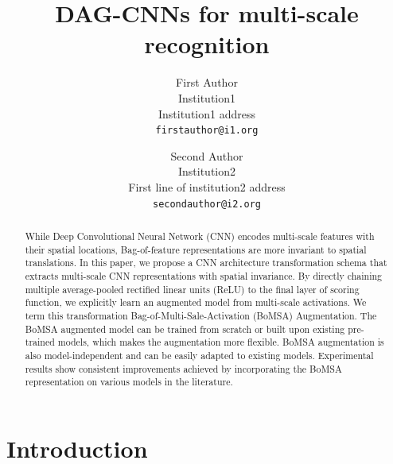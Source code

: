 \documentclass[10pt,twocolumn,letterpaper]{article}
\begin{document}
\title{DAG-CNNs for multi-scale recognition}

\author{First Author\\
Institution1\\
Institution1 address\\
{\tt\small firstauthor@i1.org}
\and
Second Author\\
Institution2\\
First line of institution2 address\\
{\tt\small secondauthor@i2.org}
}

\maketitle

\begin{abstract}
While Deep Convolutional Neural Network (CNN) encodes multi-scale features with their spatial locations, Bag-of-feature representations are more invariant to spatial translations. In this paper, we propose a CNN architecture transformation schema that extracts multi-scale CNN representations with spatial invariance. By directly chaining multiple average-pooled rectified linear units (ReLU) to the final layer of scoring function, we explicitly learn an augmented model from multi-scale activations. We term this transformation Bag-of-Multi-Sale-Activation (BoMSA) Augmentation. The BoMSA augmented model can be trained from scratch or built upon existing pre-trained models, which makes the augmentation more flexible. BoMSA augmentation is also model-independent and can be easily adapted to existing models. Experimental results show consistent improvements achieved by incorporating the BoMSA representation on various models in the literature.  

\end{abstract}

\section{Introduction}
\end{document}
